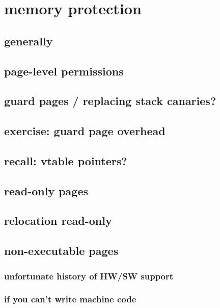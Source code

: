 
\section{memory protection}
\subsection{generally}


\subsection{page-level permissions}


\subsection{guard pages / replacing stack canaries?}


\subsection{exercise: guard page overhead}


\subsection{recall: vtable pointers?}


\subsection{read-only pages}


\subsection{relocation read-only}


\subsection{non-executable pages}


\subsubsection{unfortunate history of HW/SW support}


\subsubsection{if you can't write machine code}


